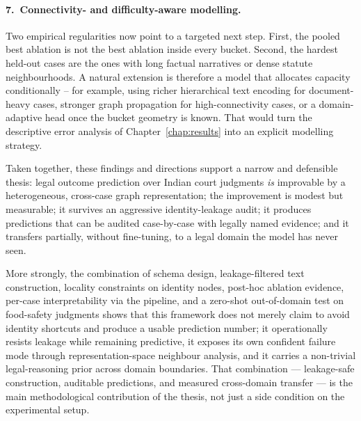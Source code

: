 {\paragraph{7.\ Connectivity- and difficulty-aware modelling.}
Two empirical regularities now point to a targeted next step. First,
the pooled best ablation is not the best ablation inside every bucket.
Second, the hardest held-out cases are the ones with long factual
narratives or dense statute neighbourhoods. A natural extension is
therefore a model that allocates capacity conditionally -- for example,
using richer hierarchical text encoding for document-heavy cases,
stronger graph propagation for high-connectivity cases, or a
domain-adaptive head once the bucket geometry is known. That would turn
the descriptive error analysis of Chapter~\ref{chap:results} into an
explicit modelling strategy.}

\medskip

Taken together, these findings and directions support a narrow and
defensible thesis: legal outcome prediction over Indian court
judgments \emph{is} improvable by a heterogeneous, cross-case graph
representation; the improvement is modest but measurable; it survives
an aggressive identity-leakage audit; it produces predictions that
can be audited case-by-case with legally named evidence; and it
transfers partially, without fine-tuning, to a legal domain the
model has never seen.

{More strongly, the combination of schema design,
leakage-filtered text construction, locality constraints on identity
nodes, post-hoc ablation evidence, per-case interpretability via the
 pipeline, and a zero-shot out-of-domain test
on food-safety judgments shows that this framework does not merely
claim to avoid identity shortcuts and produce a usable prediction
number; it operationally resists leakage while remaining predictive,
it exposes its own confident failure mode through representation-space
neighbour analysis, and it carries a non-trivial legal-reasoning
prior across domain boundaries. That combination --- leakage-safe
construction, auditable predictions, and measured cross-domain
transfer --- is the main methodological contribution of the thesis,
not just a side condition on the experimental setup.}
